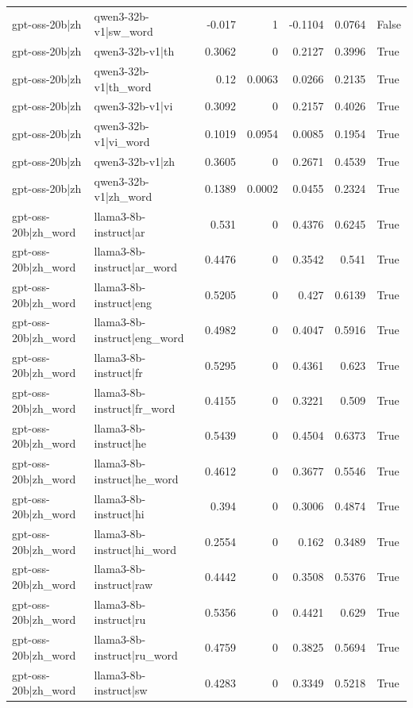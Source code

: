 \begin{table}
\begin{tabular}{l l r r r r l}
gpt-oss-20b|zh & qwen3-32b-v1|sw_word & -0.017 & 1 & -0.1104 & 0.0764 & False \\
gpt-oss-20b|zh & qwen3-32b-v1|th & 0.3062 & 0 & 0.2127 & 0.3996 & True \\
gpt-oss-20b|zh & qwen3-32b-v1|th_word & 0.12 & 0.0063 & 0.0266 & 0.2135 & True \\
gpt-oss-20b|zh & qwen3-32b-v1|vi & 0.3092 & 0 & 0.2157 & 0.4026 & True \\
gpt-oss-20b|zh & qwen3-32b-v1|vi_word & 0.1019 & 0.0954 & 0.0085 & 0.1954 & True \\
gpt-oss-20b|zh & qwen3-32b-v1|zh & 0.3605 & 0 & 0.2671 & 0.4539 & True \\
gpt-oss-20b|zh & qwen3-32b-v1|zh_word & 0.1389 & 0.0002 & 0.0455 & 0.2324 & True \\
gpt-oss-20b|zh_word & llama3-8b-instruct|ar & 0.531 & 0 & 0.4376 & 0.6245 & True \\
gpt-oss-20b|zh_word & llama3-8b-instruct|ar_word & 0.4476 & 0 & 0.3542 & 0.541 & True \\
gpt-oss-20b|zh_word & llama3-8b-instruct|eng & 0.5205 & 0 & 0.427 & 0.6139 & True \\
gpt-oss-20b|zh_word & llama3-8b-instruct|eng_word & 0.4982 & 0 & 0.4047 & 0.5916 & True \\
gpt-oss-20b|zh_word & llama3-8b-instruct|fr & 0.5295 & 0 & 0.4361 & 0.623 & True \\
gpt-oss-20b|zh_word & llama3-8b-instruct|fr_word & 0.4155 & 0 & 0.3221 & 0.509 & True \\
gpt-oss-20b|zh_word & llama3-8b-instruct|he & 0.5439 & 0 & 0.4504 & 0.6373 & True \\
gpt-oss-20b|zh_word & llama3-8b-instruct|he_word & 0.4612 & 0 & 0.3677 & 0.5546 & True \\
gpt-oss-20b|zh_word & llama3-8b-instruct|hi & 0.394 & 0 & 0.3006 & 0.4874 & True \\
gpt-oss-20b|zh_word & llama3-8b-instruct|hi_word & 0.2554 & 0 & 0.162 & 0.3489 & True \\
gpt-oss-20b|zh_word & llama3-8b-instruct|raw & 0.4442 & 0 & 0.3508 & 0.5376 & True \\
gpt-oss-20b|zh_word & llama3-8b-instruct|ru & 0.5356 & 0 & 0.4421 & 0.629 & True \\
gpt-oss-20b|zh_word & llama3-8b-instruct|ru_word & 0.4759 & 0 & 0.3825 & 0.5694 & True \\
gpt-oss-20b|zh_word & llama3-8b-instruct|sw & 0.4283 & 0 & 0.3349 & 0.5218 & True \\

\end{tabular}
\end{table}

